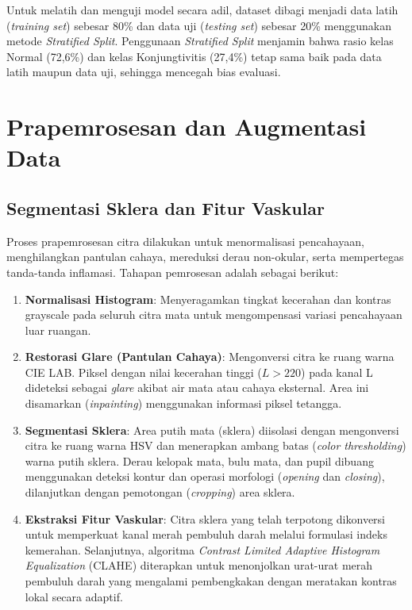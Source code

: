 Untuk melatih dan menguji model secara adil, dataset dibagi menjadi data latih (\textit{training set}) sebesar 80\% dan data uji (\textit{testing set}) sebesar 20\% menggunakan metode \textit{Stratified Split}. Penggunaan \textit{Stratified Split} menjamin bahwa rasio kelas Normal (72,6\%) dan kelas Konjungtivitis (27,4\%) tetap sama baik pada data latih maupun data uji, sehingga mencegah bias evaluasi.

\section{Prapemrosesan dan Augmentasi Data}
\label{sec:prapemrosesan-dan-augmentasi}

\subsection{Segmentasi Sklera dan Fitur Vaskular}
\label{subsec:segmentasi-sklera-vaskular}

Proses prapemrosesan citra dilakukan untuk menormalisasi pencahayaan, menghilangkan pantulan cahaya, mereduksi derau non-okular, serta mempertegas tanda-tanda inflamasi. Tahapan pemrosesan adalah sebagai berikut:
\begin{enumerate}
  \item \textbf{Normalisasi Histogram}: Menyeragamkan tingkat kecerahan dan kontras grayscale pada seluruh citra mata untuk mengompensasi variasi pencahayaan luar ruangan.
  \item \textbf{Restorasi Glare (Pantulan Cahaya)}: Mengonversi citra ke ruang warna CIE LAB. Piksel dengan nilai kecerahan tinggi ($L > 220$) pada kanal L dideteksi sebagai \textit{glare} akibat air mata atau cahaya eksternal. Area ini disamarkan (\textit{inpainting}) menggunakan informasi piksel tetangga.
  \item \textbf{Segmentasi Sklera}: Area putih mata (sklera) diisolasi dengan mengonversi citra ke ruang warna HSV dan menerapkan ambang batas (\textit{color thresholding}) warna putih sklera. Derau kelopak mata, bulu mata, dan pupil dibuang menggunakan deteksi kontur dan operasi morfologi (\textit{opening} dan \textit{closing}), dilanjutkan dengan pemotongan (\textit{cropping}) area sklera.
  \item \textbf{Ekstraksi Fitur Vaskular}: Citra sklera yang telah terpotong dikonversi untuk memperkuat kanal merah pembuluh darah melalui formulasi indeks kemerahan. Selanjutnya, algoritma \textit{Contrast Limited Adaptive Histogram Equalization} (CLAHE) diterapkan untuk menonjolkan urat-urat merah pembuluh darah yang mengalami pembengkakan dengan meratakan kontras lokal secara adaptif.
\end{enumerate}

